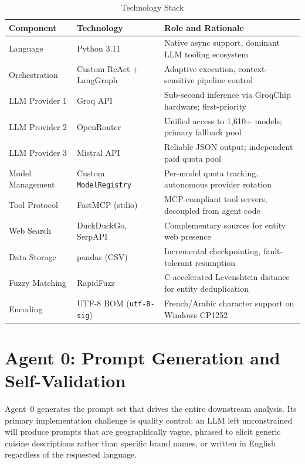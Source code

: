 \begin{table}[H]
\centering
\caption{Technology Stack}
\label{tab:stack}
\begin{tabular}{|p{3.2cm}|p{3.0cm}|p{6.8cm}|}
\hline
\textbf{Component} & \textbf{Technology} & \textbf{Role and Rationale} \\
\hline
Language & Python 3.11 & Native async support, dominant LLM tooling ecosystem \\
\hline
Orchestration & Custom ReAct + LangGraph & Adaptive execution, context-sensitive pipeline control \\
\hline
LLM Provider 1 & Groq API & Sub-second inference via GroqChip hardware; first-priority \\
\hline
LLM Provider 2 & OpenRouter & Unified access to 1,610+ models; primary fallback pool \\
\hline
LLM Provider 3 & Mistral API & Reliable JSON output; independent paid quota pool \\
\hline
Model Management & Custom \texttt{ModelRegistry} & Per-model quota tracking, autonomous provider rotation \\
\hline
Tool Protocol & FastMCP (stdio) & MCP-compliant tool servers, decoupled from agent code \\
\hline
Web Search & DuckDuckGo, SerpAPI & Complementary sources for entity web presence \\
\hline
Data Storage & pandas (CSV) & Incremental checkpointing, fault-tolerant resumption \\
\hline
Fuzzy Matching & RapidFuzz & C-accelerated Levenshtein distance for entity deduplication \\
\hline
Encoding & UTF-8 BOM (\texttt{utf-8-sig}) & French/Arabic character support on Windows CP1252 \\
\hline
\end{tabular}
\end{table}

\section{Agent 0: Prompt Generation and Self-Validation}
\label{sec:agent0impl}

Agent~0 generates the prompt set that drives the entire downstream analysis.
Its primary implementation challenge is quality control: an LLM left unconstrained
will produce prompts that are geographically vague, phrased to elicit generic
cuisine descriptions rather than specific brand names, or written in English
regardless of the requested language.


